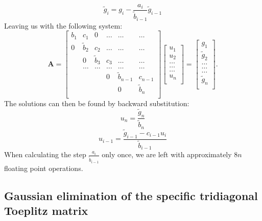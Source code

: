 \documentclass[10pt,a4paper]{article}
\begin{document}
$$\tilde{g}_i=g_i-\frac{a_i}{\tilde{b}_{i-1}} \tilde{g}_{i-1}$$
Leaving us with the following system:
\[
    \mathbf{A} = \begin{bmatrix}
                           b_1& c_1 & 0 &\dots   & \dots &\dots \\
                           0& \tilde{b}_{2} & c_2 &\dots &\dots &\dots \\
                           & 0 & \tilde{b}_{3} & c_3 & \dots & \dots \\
                           & \dots   & \dots &\dots   &\dots & \dots \\
                           &   &  & 0  &\tilde{b}_{n-1}& c_{n-1} \\
		      &    &  &   &0 &\tilde{b}_n  \\
                      \end{bmatrix}\begin{bmatrix}
                           u_1\\
                           u_2\\
                           \dots \\
                          \dots  \\
                          \dots \\
                           u_n\\
                      \end{bmatrix}
  =\begin{bmatrix}
                           g_1\\
                           \tilde{g}_2\\
                           \dots \\
                           \dots \\
                          \dots \\
                           \tilde{g}_n\\
                      \end{bmatrix}.
\]
The solutions can then be found by backward substitution: 
$$u_n = \frac{\tilde{g}_n}{\tilde{b}_n}$$
$$u_{i-1} = \frac{\tilde{g}_{i-1}-c_{i-1} u_i}{\tilde{b}_{i-1}}$$
When calculating the step $\frac{a_i}{\tilde{b}_{i-1}}$ only once, we are left with approximately $8n$ floating point operations.
\subsection{Gaussian elimination of the specific tridiagonal Toeplitz matrix}
\end{document}
